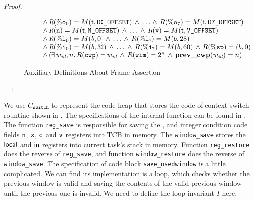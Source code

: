 \begin{proof}
\begin{enumerate}
\begin{figure}[!t]
\[\begin{array}{lcl}
                    & & \, \land \, 
                    R(\%\texttt{o}_{0}) = M(\textsf{t}, \texttt{O0\_OFFSET}) \, \land \, \dots \, \land \, 
                    R(\%\texttt{o}_{7}) = M(\textsf{t}, \texttt{O7\_OFFSET})  \\
                    & & \, \land \, 
                    R(\texttt{n}) = M(\textsf{t}, \texttt{N\_OFFSET}) \, \land \, \dots \, \land \, 
                    R(\texttt{v}) = M(\textsf{t}, \texttt{V\_OFFSET}) \\
                    & & \, \land \, 
                    R(\%\texttt{l}_{0}) = M(b, 0) \, \land \, \dots \, \land \, 
                    R(\%\texttt{l}_{7}) = M(b, 28) \\
                    & & \, \land \, 
                    R(\%\texttt{i}_{0}) = M(b, 32) \, \land \, \dots \, \land \, 
                    R(\%\texttt{i}_{7}) = M(b, 60) \, \land \, 
                    R(\%\texttt{sp}) = (b, 0) \\
                    & & \, \land \, 
                    (\exists \, w_{\textit{id}}, n. \, R(\texttt{cwp}) = w_{\textit{id}} \, \land \, 
                    R(\texttt{wim}) = 2^n \, \land \, \textbf{prev\_cwp}{(w_{\textit{id}})} = n) \\
                \end{array}
            \]
            \caption{Auxiliary Definitions About Frame Assertion}
        \end{figure}
    \end{enumerate} 
\end{proof}

We use $C_{\texttt{switch}}$ to represent the 
code heap that stores the code of context switch rountine shown 
in \Fig{\ref{fig:Main function of context switch routine}}. 
The specifications of the internal function can be found in 
\Fig{\ref{fig:Specifications of Internal Functions}}. The 
function \texttt{reg\_save} is responsible for saving the 
\localRN{}, \inRN{} and integer condition code fields $\texttt{n}$, 
$\texttt{z}$, $\texttt{c}$ and $\texttt{v}$ registers into TCB in memory. 
The \texttt{window\_save} stores the 
$\textsf{local}$ and $\textsf{in}$ registers into current task's stack in memory. 
Function \texttt{reg\_restore} does the reverse of 
\texttt{reg\_save}, and function \texttt{window\_restore} does the 
reverse of \texttt{window\_save}. The specification of code block 
\texttt{save\_usedwindow} is a little complicated. 
We can find its implementation is a loop, which checks whether the 
previous window is valid and saving the contents of the valid 
previous window until the previous one is invalid. 
We need to define the loop invariant $I$ here. 

